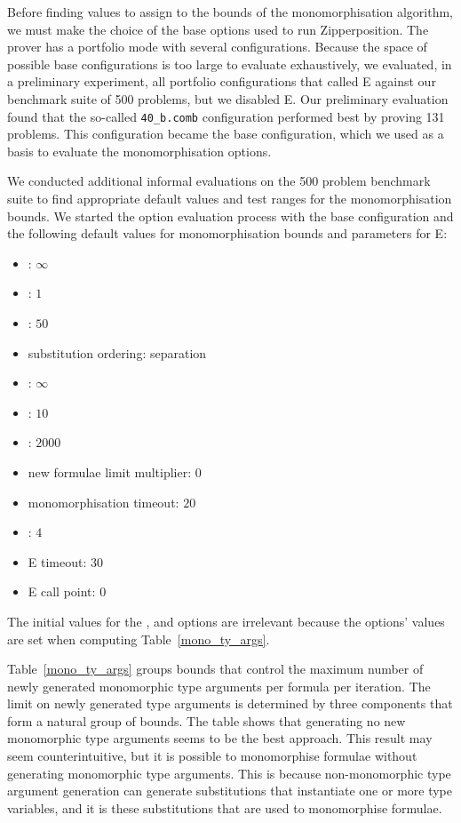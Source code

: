 \documentclass[runningheads]{llncs}
\begin{document}
Before finding values to assign to the bounds of the monomorphisation algorithm, we must make the choice of the base options used to run Zipperposition. The prover has a portfolio mode with several configurations. Because the space of possible base configurations is too large to evaluate exhaustively, we evaluated, in a preliminary experiment, all portfolio configurations that called E against our benchmark suite of 500 problems, but we disabled E.
Our preliminary evaluation found that the so-called \verb|40_b.comb| configuration performed best by proving 131 problems.
This configuration became the base configuration, which we used as a basis to evaluate the monomorphisation options.

We conducted additional informal evaluations on the 500 problem benchmark suite to find appropriate default values and test ranges for the monomorphisation bounds. We started the option evaluation process with the base configuration and the following default values for monomorphisation bounds and parameters for E:

\begin{multicols}{2}%
\begin{itemize}
   \item \PolyCap: \(\infty\)
   \item \PolyMult: \(1\)
   \item \PolyFloor: \(50\)
   \item substitution ordering: separation
   \item \SubstLimit: \(\infty\)
   \item \MonoSubstsLimit: \(10\)
   \item \Limit: \(2000\)
   \item new formulae limit multiplier: \(0\)
   \item monomorphisation timeout: \(20\)
   \item \Loop: \(4\)
   \item E timeout: \(30\)
   \item E call point: \(0\)
\end{itemize}
\end{multicols}
\noindent
The initial values for the \MonoCap, \MonoMult and \MonoFloor options are irrelevant because the options' values are set when computing Table~\ref{mono_ty_args}.%

Table~\ref{mono_ty_args} groups bounds that control the maximum number of newly generated monomorphic type arguments per formula per iteration. The limit on newly generated type arguments is determined by three components that form a natural group of bounds. The table shows that generating no new monomorphic type arguments seems to be the best approach. This result may seem counterintuitive, but it is possible to monomorphise formulae without generating monomorphic type arguments. This is because non-monomorphic type argument generation can generate substitutions that instantiate one or more type variables, and it is these substitutions that are used to monomorphise formulae.
\end{document}
